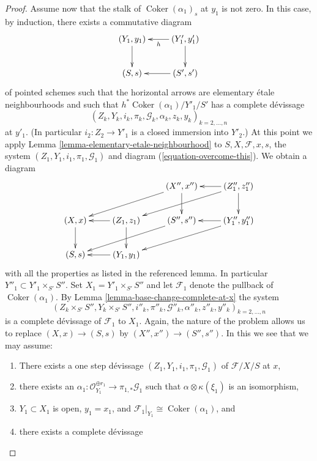 \documentclass{amsart}
\theoremstyle{plain}
\theoremstyle{definition}
\theoremstyle{remark}
\numberwithin{equation}{subsection}
\def\Coker{\mathop{\mathrm{Coker}}}
\begin{document}
\begin{proof}
\medskip\noindent
Assume now that the stalk of $\Coker(\alpha_1)_s$
at $y_1$ is not zero. In this case, by induction, there exists a
commutative diagram
\begin{equation}
\label{equation-overcome-this}
\vcenter{
\xymatrix{
(Y_1, y_1) \ar[d] & (Y'_1, y'_1) \ar[l]^h \ar[d] \\
(S, s) & (S', s') \ar[l]
}
}
\end{equation}
of pointed schemes such that the horizontal
arrows are elementary \'etale neighbourhoods
and such that $h^*\Coker(\alpha_1)/Y'_1/S'$ has a complete
d\'evissage
$$
(Z_k, Y_k, i_k, \pi_k, \mathcal{G}_k, \alpha_k, z_k, y_k)_{k = 2, \ldots, n}
$$
at $y'_1$. (In particular $i_2 : Z_2 \to Y'_1$ is a closed immersion into
$Y'_2$.) At this point we apply
Lemma \ref{lemma-elementary-etale-neighbourhood}
to $S, X, \mathcal{F}, x, s$, the system
$(Z_1, Y_1, i_1, \pi_1, \mathcal{G}_1)$ and
diagram (\ref{equation-overcome-this}). We obtain a diagram
$$
\xymatrix{
& & (X'', x'') \ar[lld] \ar[d] & (Z''_1, z''_1) \ar[l] \ar[lld] \ar[d] \\
(X, x) \ar[d] & (Z_1, z_1) \ar[l] \ar[d] &
(S'', s'') \ar[lld] & (Y''_1, y''_1) \ar[lld] \ar[l] \\
(S, s) & (Y_1, y_1) \ar[l]
}
$$
with all the properties as listed in the referenced lemma.
In particular $Y''_1 \subset Y'_1 \times_{S'} S''$. Set
$X_1 = Y'_1 \times_{S'} S''$ and let $\mathcal{F}_1$ denote the
pullback of $\Coker(\alpha_1)$. By
Lemma \ref{lemma-base-change-complete-at-x}
the system
\begin{equation}
\label{equation-shrink-this}
(Z_k \times_{S'} S'',
Y_k \times_{S'} S'', i''_k, \pi''_k, \mathcal{G}''_k,
\alpha''_k, z''_k, y''_k)_{k = 2, \ldots, n}
\end{equation}
is a complete d\'evissage of $\mathcal{F}_1$
to $X_1$. Again, the nature of the problem allows
us to replace $(X, x) \to (S, s)$ by $(X'', x'') \to (S'', s'')$.
In this we see that we may assume:
\begin{enumerate}
\item[(a)] There exists a one step d\'evissage
$(Z_1, Y_1, i_1, \pi_1, \mathcal{G}_1)$ of $\mathcal{F}/X/S$ at $x$,
\item[(b)] there exists an $\alpha_1 : \mathcal{O}_{Y_1}^{\oplus r_1}
\to \pi_{1, *}\mathcal{G}_1$ such that $\alpha \otimes \kappa(\xi_1)$
is an isomorphism,
\item[(c)] $Y_1 \subset X_1$ is open, $y_1 = x_1$, and
$\mathcal{F}_1|_{Y_1} \cong \Coker(\alpha_1)$, and
\item[(d)] there exists a complete d\'evissage

\end{enumerate}
\end{proof}
\end{document}
